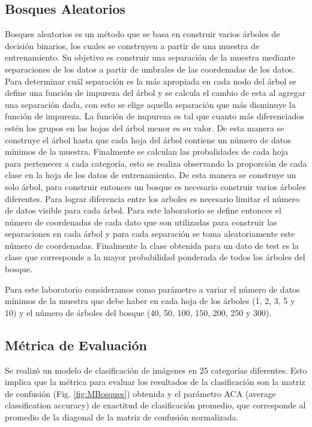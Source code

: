 \documentclass[10pt,twocolumn,letterpaper]{article}
\begin{document}
\subsection{Bosques Aleatorios}
Bosques aleatorios es un método que se basa en construir varios árboles de decisión binarios, los cuales se construyen a partir de una muestra de entrenamiento. Su objetivo es construir una separación de la muestra mediante separaciones de los datos a partir de umbrales de las coordenadas de los datos. Para determinar cuál separación es la más apropiada en cada nodo del árbol se define una función de impureza del árbol y se calcula el cambio de esta al agregar una separación dada, con esto se elige aquella separación que más disminuye la función de impureza. La función de impureza es tal que cuanto más diferenciados estén los grupos en las hojas del árbol menor es su valor. De esta manera se construye el árbol hasta que cada hoja del árbol contiene un número de datos mínimos de la muestra.  Finalmente se calculan las probalidades de cada hoja para pertenecer a cada categoría, esto se realiza observando la proporción de cada clase en la hoja de los datos de entrenamiento. De esta manera se construye un solo árbol, para construir entonces un bosque es necesario construir varios árboles diferentes. Para lograr diferencia entre los arboles es necesario limitar el número de datos visible para cada árbol. Para este laboratorio se define entonces el número de coordenadas de cada dato que son utilizadas para construir las separaciones en cada árbol y para cada separación se toma aleatoriamente este número de coordenadas.  Finalmente la clase obtenida para un dato de test es la clase que corresponde a la mayor probabilidad ponderada de todos los árboles del bosque. 

Para este laboratorio consideramos como parámetro a variar el número de datos mínimos de la muestra que debe haber en cada hoja de los árboles (1, 2, 3, 5 y 10) y el número de árboles del bosque (40, 50, 100, 150, 200, 250 y 300). 

\subsection{Métrica de Evaluación}
Se realizó un modelo de clasificación de imágenes en 25 categorías diferentes. Esto implica que la métrica para evaluar los resultados de la clasificación son la matriz de confusión (Fig. \ref{fig:MBosques}) obtenida y el parámetro ACA (average classification accuracy) de exactitud de clasificación promedio, que corresponde al promedio de la diagonal de la matriz de confusión normalizada. 
\end{document}
